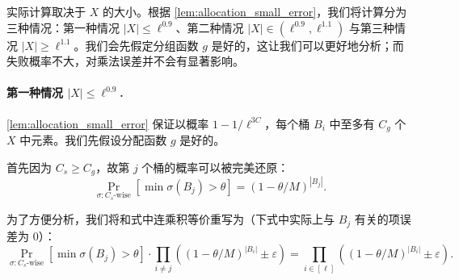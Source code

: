 实际计算取决于 $X$ 的大小。根据 \cref{lem:allocation_small_error}，我们将计算分为三种情况：第一种情况 $|X| \le \ell^{0.9}$、第二种情况 $|X| \in (\ell^{0.9}, \ell^{1.1})$ 与第三种情况 $|X| \ge \ell^{1.1}$。我们会先假定分组函数 $g$ 是好的，这让我们可以更好地分析；而失败概率不大，对乘法误差并不会有显著影响。

\paragraph{第一种情况 $|X| \le \ell^{0.9}$.} \cref{lem:allocation_small_error} 保证以概率 $1 - 1 / \ell^{3 C}$，每个桶 $B_i$ 中至多有 $C_g$ 个 $X$ 中元素。我们先假设分配函数 $g$ 是好的。

首先因为 $C_s \ge C_g$，故第 $j$ 个桶的概率可以被完美还原：
$$
\Pr_{\sigma : C_s\text{-wise}}[ \min \sigma(B_j) > \theta] = (1 - \theta / M)^{|B_j|}.
$$

为了方便分析，我们将和式中连乘积等价重写为（下式中实际上与 $B_j$ 有关的项误差为 $0$）：
$$
\Pr_{\sigma : C_s\text{-wise}}[\min \sigma(B_j) > \theta] \cdot \prod_{i \ne j} \left( (1 - \theta / M)^{|B_i|} \pm \varepsilon \right) = \prod_{i \in [\ell]} \left( (1 - \theta / M)^{|B_i|} \pm \varepsilon \right).
$$

